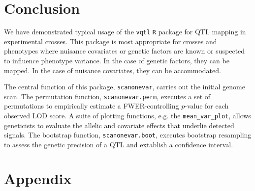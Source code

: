 \documentclass{article}
\begin{document}





\section*{Conclusion}

We have demonstrated typical usage of the \texttt{vqtl} \texttt{R} package for QTL mapping in experimental crosses.
This package is most appropriate for crosses and phenotypes where nuisance covariates or genetic factors are known or suspected to influence phenotype variance.
In the case of genetic factors, they can be mapped.
In the case of nuisance covariates, they can be accommodated.

The central function of this package, \texttt{scanonevar}, carries out the initial genome scan.
The permutation function, \texttt{scanonevar.perm}, executes a set of permutations to empirically estimate a FWER-controlling $p$-value for each observed LOD score.
A suite of plotting functions, e.g. the \texttt{mean\_var\_plot}, allows geneticists to evaluate the allelic and covariate effects that underlie detected signals.
The bootstrap function, \texttt{scanonevar.boot}, executes bootstrap resampling to assess the genetic precision of a QTL and extablish a confidence interval. 


\printbibliography


\clearpage
\newpage
\section*{Appendix}
\end{document}
